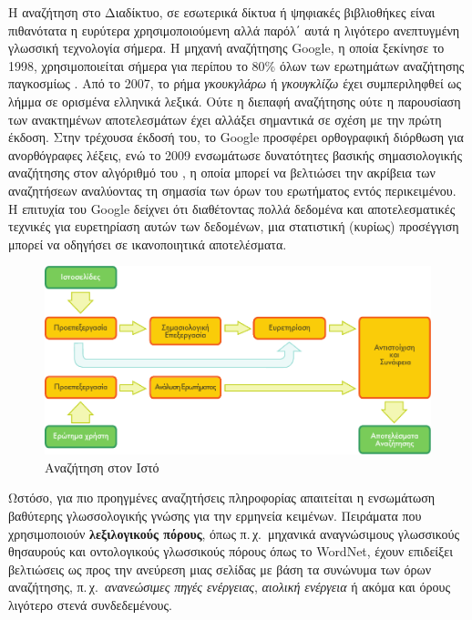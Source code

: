 \begin{multicols}{2}
Η αναζήτηση στο Διαδίκτυο, σε εσωτερικά δίκτυα ή ψηφιακές βιβλιοθήκες είναι πιθανότατα η ευρύτερα χρησιμοποιούμενη αλλά παρόλ΄ αυτά η λιγότερο ανεπτυγμένη γλωσσική τεχνολογία σήμερα. Η μηχανή αναζήτησης Google, η οποία ξεκίνησε το 1998, χρησιμοποιείται σήμερα για περίπου το 80\% όλων των ερωτημάτων αναζήτησης παγκοσμίως \cite{spi1}. Από το 2007, το ρήμα \textit{γκουκγλάρω} ή \textit{γκουγκλίζω} έχει συμπεριληφθεί ως λήμμα σε ορισμένα ελληνικά λεξικά. Ούτε η διεπαφή αναζήτησης ούτε η παρουσίαση των ανακτημένων αποτελεσμάτων έχει αλλάξει σημαντικά σε σχέση με την πρώτη έκδοση. Στην τρέχουσα έκδοσή του, το Google προσφέρει ορθογραφική διόρθωση για ανορθόγραφες λέξεις, ενώ το 2009 ενσωμάτωσε δυνατότητες βασικής σημασιολογικής αναζήτησης στον αλγόριθμό του \cite{pc1}, η οποία μπορεί να βελτιώσει την ακρίβεια των αναζητήσεων αναλύοντας τη σημασία των όρων του ερωτήματος εντός περικειμένου. Η επιτυχία του Google δείχνει ότι διαθέτοντας πολλά δεδομένα και αποτελεσματικές τεχνικές για ευρετηρίαση αυτών των δεδομένων, μια στατιστική (κυρίως) προσέγγιση μπορεί να οδηγήσει σε ικανοποιητικά αποτελέσματα.

\begin{figure}[htb]
  \center
  \includegraphics[width=\textwidth]{../_media/greek/web_search_architecture}
  \caption{Αναζήτηση στον Ιστό}
  \label{fig:websearcharch_de}
\end{figure}

Ωστόσο, για πιο προηγμένες αναζητήσεις   πληροφορίας  απαιτείται η ενσωμάτωση βαθύτερης γλωσσολογικής γνώσης για την ερμηνεία κειμένων. Πειράματα που χρησιμοποιούν \textbf{λεξιλογικούς πόρους}, όπως π.\,χ.~μηχανικά αναγνώσιμους γλωσσικούς θησαυρούς και οντολογικούς γλωσσικούς πόρους  όπως το WordNet, έχουν επιδείξει βελτιώσεις ως προς την ανεύρεση μιας σελίδας με βάση τα συνώνυμα των όρων αναζήτησης, π.\,χ.~\textit{ανανεώσιμες πηγές ενέργειας}, \textit{αιολική ενέργεια} ή ακόμα και όρους λιγότερο στενά συνδεδεμένους.


\end{multicols}
